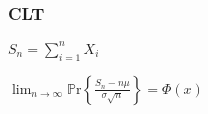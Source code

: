 \documentclass[9pt,landscape]{article}
\begin{document}
\begin{multicols}{3}
\subsubsection{CLT}

$S_n=\sum_{i=1}^{n}X_i$

$\lim_{n\to\infty}\mathbb{P}\mathrm{r}\left\{\frac{S_n-n\mu}{\sigma\sqrt{n}}\right\}=\Phi(x)$


%
%
%
%
%
%

\end{multicols}
\end{document}
